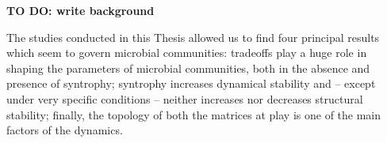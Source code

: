 \documentclass[12pt, titlepage]{report}
\begin{document}
%
%

\textbf{TO DO: write background}

The studies conducted in this Thesis allowed us to find four principal results which seem to govern microbial communities: tradeoffs play a huge role in shaping the parameters of microbial communities, both in the absence and presence of syntrophy; syntrophy increases dynamical stability and -- except under very specific conditions -- neither increases nor decreases structural stability; finally, the topology of both the matrices at play is one of the main factors of the dynamics.
\end{document}
